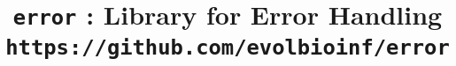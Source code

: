 

\pagestyle{noweb}

\title{\texttt{error} : Library for Error
  Handling\\\small \texttt{https://github.com/evolbioinf/error}}
\author{}

\date{}
\maketitle






